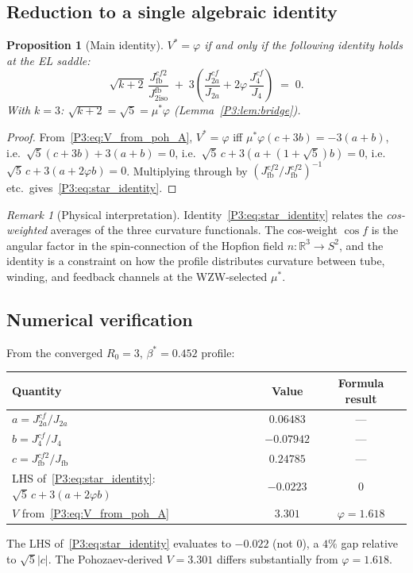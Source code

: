 \documentclass[11pt,a4paper]{article}
\newtheorem{proposition}[theorem]{Proposition}
\theoremstyle{definition}
\theoremstyle{remark}
\newtheorem{remark}[theorem]{Remark}
\newcommand{\vp}{\varphi}
\newcommand{\bst}{\beta^{*}}
\newcommand{\Jfb}{J_{2\mathrm{iso}}^{\mathrm{fb}}}
\newcommand{\Ja}{J_{2a}}
\newcommand{\Jfour}{J_{4}}
\begin{document}
\subsection{Reduction to a single algebraic identity}

\begin{proposition}[Main identity]
\label{P3:prop:star_identity}
$V^* = \vp$ if and only if the following identity holds at the EL saddle:
\begin{equation}
  \sqrt{k+2}\,\frac{J_{\mathrm{fb}}^{cf2}}{\Jfb}
  \;+\; 3\!\left(\frac{J_{2a}^{cf}}{\Ja} + 2\vp\,\frac{J_4^{cf}}{\Jfour}\right)
  \;=\; 0.
  \label{P3:eq:star_identity}
\end{equation}
With $k=3$: $\sqrt{k+2} = \sqrt{5} = \mu^*\vp$ (Lemma~\ref{P3:lem:bridge}).
\end{proposition}

\begin{proof}
From~\eqref{P3:eq:V_from_poh_A}, $V^* = \vp$ iff
$\mu^*\vp(c+3b) = -3(a+b)$, i.e.\
$\sqrt{5}(c+3b)+3(a+b)=0$, i.e.\
$\sqrt{5}\,c+3(a+(1+\sqrt{5})b)=0$, i.e.\
$\sqrt{5}\,c+3(a+2\vp b)=0$.
Multiplying through by $(J_{\mathrm{fb}}^{cf2}/J_{\mathrm{fb}}^{cf2})^{-1}$ etc.\ gives~\eqref{P3:eq:star_identity}.
\end{proof}

\begin{remark}[Physical interpretation]
\label{P3:rem:star_identity_interp}
Identity~\eqref{P3:eq:star_identity} relates the \emph{cos-weighted} averages of
the three curvature functionals.  The cos-weight $\cos f$ is the angular factor
in the spin-connection of the Hopfion field $n: \mathbb{R}^3\to S^2$, and the
identity is a constraint on how the profile distributes curvature between
tube, winding, and feedback channels at the WZW-selected $\mu^*$.
\end{remark}

\subsection{Numerical verification}

From the converged $R_0=3$, $\bst=0.452$ profile:
\begin{center}
\renewcommand{\arraystretch}{1.3}
\begin{tabular}{lcc}
\toprule
Quantity & Value & Formula result \\
\midrule
$a = J_{2a}^{cf}/J_{2a}$ & $0.06483$ & --- \\
$b = J_4^{cf}/J_4$ & $-0.07942$ & --- \\
$c = J_{\mathrm{fb}}^{cf2}/J_{\mathrm{fb}}$ & $0.24785$ & --- \\
LHS of~\eqref{P3:eq:star_identity}: $\sqrt{5}\,c + 3(a+2\vp b)$ & $-0.0223$ & $0$ \\
$V$ from~\eqref{P3:eq:V_from_poh_A} & $3.301$ & $\vp = 1.618$ \\
\bottomrule
\end{tabular}
\end{center}
The LHS of~\eqref{P3:eq:star_identity} evaluates to $-0.022$ (not $0$),
a $4\%$ gap relative to $\sqrt{5}|c|$.  The Pohozaev-derived
$V = 3.301$ differs substantially from $\vp = 1.618$.
\end{document}
